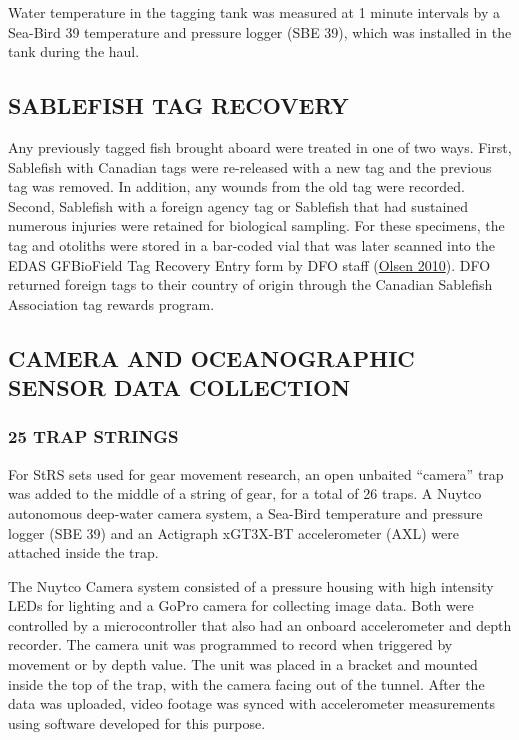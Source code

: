 \documentclass[12pt]{article}\usepackage[]{graphicx}\usepackage[]{color}
\begin{document}
Water temperature in the tagging tank was measured at 1 minute intervals by a Sea-Bird 39 temperature and pressure logger (SBE 39), which was installed in the tank during the haul.

\hypertarget{sablefish-tag-recovery}{%
\subsection{SABLEFISH TAG RECOVERY}\label{sablefish-tag-recovery}}

Any previously tagged fish brought aboard were treated in one of two ways. First, Sablefish with Canadian tags were re-released with a new tag and the previous tag was removed. In addition, any wounds from the old tag were recorded. Second, Sablefish with a foreign agency tag or Sablefish that had sustained numerous injuries were retained for biological sampling. For these specimens, the tag and otoliths were stored in a bar-coded vial that was later scanned into the EDAS GFBioField Tag Recovery Entry form by DFO staff (\protect\hyperlink{ref-Olsen2010}{Olsen 2010}). DFO returned foreign tags to their country of origin through the Canadian Sablefish Association tag rewards program.

\hypertarget{camera-and-oceanographic-sensor-data-collection}{%
\subsection{CAMERA AND OCEANOGRAPHIC SENSOR DATA COLLECTION}\label{camera-and-oceanographic-sensor-data-collection}}

\hypertarget{twenty-fivetraps}{%
\subsubsection{25 TRAP STRINGS}\label{twenty-fivetraps}}

For StRS sets used for gear movement research, an open unbaited ``camera'' trap was added to the middle of a string of gear, for a total of 26 traps. A Nuytco autonomous deep-water camera system, a Sea-Bird temperature and pressure logger (SBE 39) and an Actigraph xGT3X-BT accelerometer (AXL) were attached inside the trap.

The Nuytco Camera system consisted of a pressure housing with high intensity LEDs for lighting and a GoPro camera for collecting image data. Both were controlled by a microcontroller that also had an onboard accelerometer and depth recorder. The camera unit was programmed to record when triggered by movement or by depth value. The unit was placed in a bracket and mounted inside the top of the trap, with the camera facing out of the tunnel. After the data was uploaded, video footage was synced with accelerometer measurements using software developed for this purpose.
\end{document}
